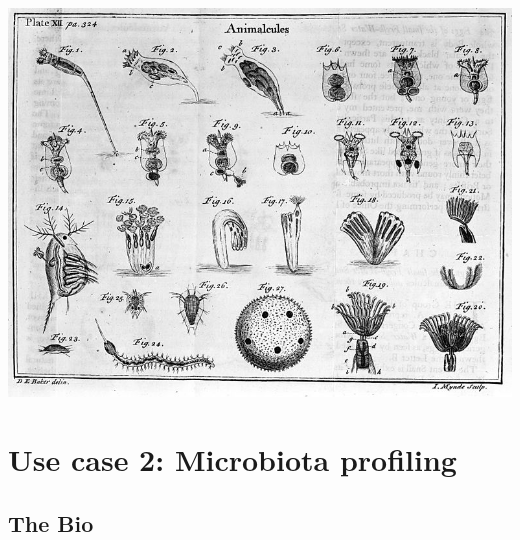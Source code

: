 \begin{justify}
\begin{center}
\begin{minipage}{5in}
\begin{center}
{\vspace*{2cm}
\includegraphics[scale=2]{chapters/images/mycrobiota/animalcules2.png}

}

\end{center}
\end{minipage}
\end{center}

\newpage


\section{Use case 2: Microbiota profiling}

\subsection{The Bio}


\end{justify}
